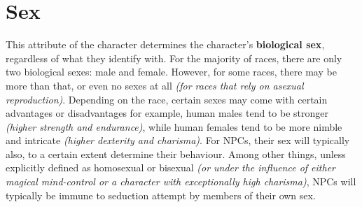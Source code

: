 \section{Sex}
This attribute of the character determines the character's \textbf{biological sex}, regardless of what they identify with. For the majority of races, there are only two biological sexes: male and female. However, for some races, there may be more than that, or even no sexes at all \textit{(for races that rely on asexual reproduction)}.\newline
Depending on the race, certain sexes may come with certain advantages or disadvantages \textemdash for example, human males tend to be stronger \textit{(higher strength and endurance)}, while human females tend to be more nimble and intricate \textit{(higher dexterity and charisma)}.
For NPCs, their sex will typically also, to a certain extent determine their behaviour. Among other things, unless explicitly defined as homosexual or bisexual \textit{(or under the influence of either magical mind-control or a character with exceptionally high charisma)}, NPCs will typically be immune to seduction attempt by members of their own sex.
